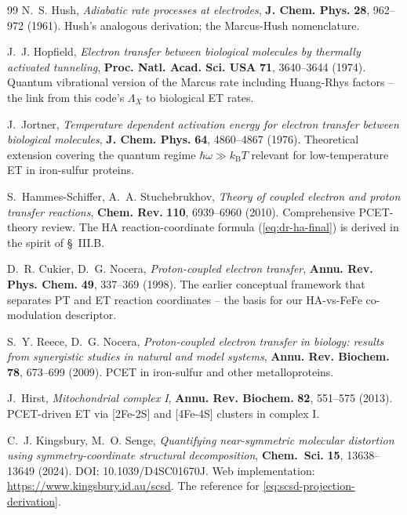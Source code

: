 \documentclass[10pt,a4paper,twoside]{article}
\newcommand{\kB}{k_{\mathrm{B}}}
\begin{document}
\begin{thebibliography}{99}
N.~S. Hush,
\emph{Adiabatic rate processes at electrodes},
\textbf{J. Chem. Phys.} \textbf{28}, 962--972 (1961).
Hush's analogous derivation; the Marcus-Hush nomenclature.

J.~J. Hopfield,
\emph{Electron transfer between biological molecules by thermally
activated tunneling},
\textbf{Proc. Natl. Acad. Sci. USA} \textbf{71}, 3640--3644 (1974).
Quantum vibrational version of the Marcus rate including
Huang-Rhys factors -- the link from this code's $\Lambda_X$ to
biological ET rates.

J.~Jortner,
\emph{Temperature dependent activation energy for electron
transfer between biological molecules},
\textbf{J. Chem. Phys.} \textbf{64}, 4860--4867 (1976).
Theoretical extension covering the quantum regime $\hbar\omega \gg
\kB T$ relevant for low-temperature ET in iron-sulfur proteins.

S.~Hammes-Schiffer, A.~A. Stuchebrukhov,
\emph{Theory of coupled electron and proton transfer reactions},
\textbf{Chem. Rev.} \textbf{110}, 6939--6960 (2010).
Comprehensive PCET-theory review. The HA reaction-coordinate
formula (\cref{eq:dr-ha-final}) is derived in the spirit of
\S~III.B.

D.~R. Cukier, D.~G. Nocera,
\emph{Proton-coupled electron transfer},
\textbf{Annu. Rev. Phys. Chem.} \textbf{49}, 337--369 (1998).
The earlier conceptual framework that separates PT and ET reaction
coordinates -- the basis for our HA-vs-FeFe co-modulation
descriptor.

S.~Y. Reece, D.~G. Nocera,
\emph{Proton-coupled electron transfer in biology: results from
synergistic studies in natural and model systems},
\textbf{Annu. Rev. Biochem.} \textbf{78}, 673--699 (2009).
PCET in iron-sulfur and other metalloproteins.

J.~Hirst,
\emph{Mitochondrial complex I},
\textbf{Annu. Rev. Biochem.} \textbf{82}, 551--575 (2013).
PCET-driven ET via [2Fe-2S] and [4Fe-4S] clusters in complex I.

C.~J. Kingsbury, M.~O. Senge,
\emph{Quantifying near-symmetric molecular distortion using
symmetry-coordinate structural decomposition},
\textbf{Chem.\ Sci.} \textbf{15}, 13638--13649 (2024).
DOI: 10.1039/D4SC01670J. Web implementation:
\url{https://www.kingsbury.id.au/scsd}.
The reference for \cref{eq:scsd-projection-derivation}.


\end{thebibliography}
\end{document}
